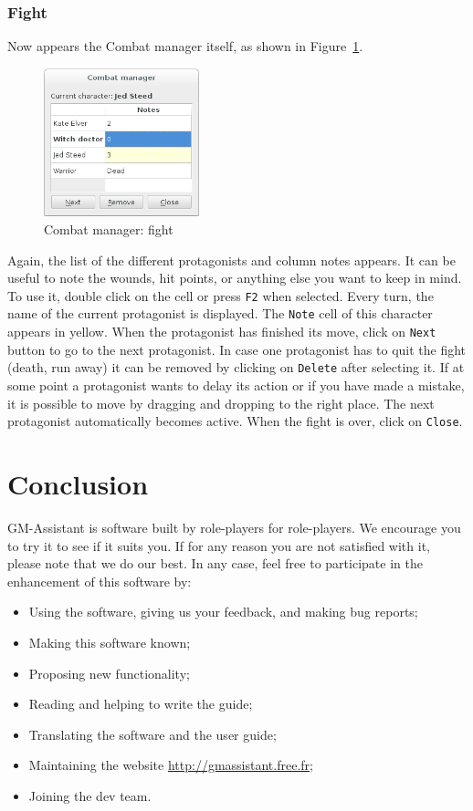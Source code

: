 \documentclass[a4paper,12pt]{article}
\newcommand*{\GMA}{GM-Assistant\xspace}
\newcommand*{\interfaceitem}[1]{\texttt{#1}}
\begin{document}
\subsubsection{Fight}

Now appears the Combat manager itself, as shown in Figure~\ref{gestion_combat_fight}.
\begin{figure}[ht]
    \centerline{\includegraphics[width=0.4\textwidth]{combat_fight}}
    \caption{Combat manager: fight}
    \label{gestion_combat_fight}
\end{figure}
Again, the list of the different protagonists and column notes appears.
It can be useful to note the wounds, hit points, or anything else you want to keep in mind. To use it, double click on the cell or press \interfaceitem{F2} when selected. Every turn, the name of the current protagonist is displayed. The \interfaceitem{Note} cell of this character appears in yellow. When the protagonist has finished its move, click on \interfaceitem{Next} button to go to the next protagonist.
In case one protagonist has to quit the fight (death, run away) it can be removed by clicking on \interfaceitem{Delete} after selecting it. If at some point a protagonist wants to delay its action or if you have made a mistake, it is possible to move by dragging and dropping to the right place. The next protagonist automatically becomes active.
When the fight is over, click on \interfaceitem{Close}.

\section{Conclusion}\label{conclusions}
\GMA is software built by role-players for role-players. We encourage you to try it to see if it suits you. If for any reason you are not satisfied with it, please note that we do our best. In any case, feel free to participate in the enhancement of this software by:
	\begin{itemize}
    \item Using the software, giving us your feedback, and making bug reports;
    \item Making this software known;
    \item Proposing new functionality;
    \item Reading and helping to write the guide;
    \item Translating the software and the user guide;
    \item Maintaining the website 
 \url{http://gmassistant.free.fr};
    \item Joining the dev team.
\end{itemize}
\end{document}

